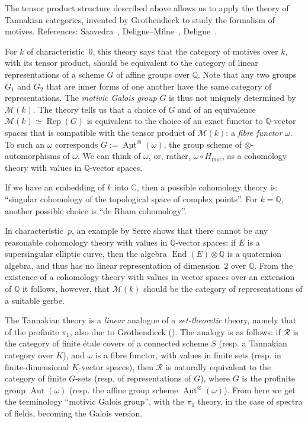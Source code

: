 \documentclass{article}
\theoremstyle{plain}
\theoremstyle{definition}
\newcommand{\scr}[1]{{\mathscr{#1}}}
\newcommand{\QQ}{\mathbb{Q}}
\newcommand{\CC}{\mathbb{C}}
\newcommand{\mot}{\mathrm{mot}}
\DeclareMathOperator{\End}{End}
\DeclareMathOperator{\Aut}{Aut}
\DeclareMathOperator{\Rep}{Rep}
\newcommand{\oldpage}[1]{\marginpar{\footnotesize$\Big\vert$ \textit{p.~#1}}}
\begin{document}
The tensor product structure described above allows us to apply the theory of Tannakian categories, invented by Grothendieck to study the formalism of motives.
References: Saavedra~\cite{28}, Deligne--Milne~\cite{12}, Deligne~\cite{15}.

For $k$ of characteristic~$0$, this theory says that the category of motives over $k$, with its tensor product, should be equivalent to the category of linear representations of a scheme $G$ of affine groups over $\QQ$.
Note that any two groups $G_1$ and $G_2$ that are inner forms of one another have the same category of representations.
The \emph{motivic Galois group} $G$ is thus not uniquely determined by $\scr{M}(k)$.
The theory tells us that a choice of $G$ and of an equivalence $\scr{M}(k)\simeq\Rep(G)$ is equivalent to the choice of an exact functor to $\QQ$-vector spaces that is compatible with the tensor product of $\scr{M}(k)$: a \emph{fibre functor} $\omega$.
To such an $\omega$ corresponds $G:=\underline{\Aut}^\otimes(\omega)$, the group scheme of $\otimes$-automorphisms of $\omega$.
We can think of $\omega$, or, rather, $\omega\circ H_\mot$, as a cohomology theory with values in $\QQ$-vector spaces.

\oldpage{146}
If we have an embedding of $k$ into $\CC$, then a possible cohomology theory is: ``singular cohomology of the topological space of complex points''.
For $k=\QQ$, another possible choice is ``de Rham cohomology''.

In characteristic~$p$, an example by Serre shows that there cannot be any reasonable cohomology theory with values in $\QQ$-vector spaces: if $E$ is a supersingular elliptic curve, then the algebra $\End(E)\otimes\QQ$ is a quaternion algebra, and thus has no linear representation of dimension~$2$ over $\QQ$.
From the existence of a cohomology theory with values in vector spaces over an extension of $\QQ$ it follows, however, that $\scr{M}(k)$ should be the category of representations of a suitable gerbe.

The Tannakian theory is a \emph{linear} analogue of a \emph{set-theoretic} theory, namely that of the profinite $\pi_1$, also due to Grothendieck (\cite{SGA1}).
The analogy is as follows: if $\scr{R}$ is the category of finite \'{e}tale covers of a connected scheme $S$ (resp. a Tannakian category over $K$), and $\omega$ is a fibre functor, with values in finite sets (resp. in finite-dimensional $K$-vector spaces), then $\scr{R}$ is naturally equivalent to the category of finite $G$-sets (resp. of representations of $G$), where $G$ is the profinite group $\Aut(\omega)$ (resp. the affine group scheme $\underline{\Aut}^\otimes(\omega)$).
From here we get the terminology ``motivic Galois group'', with the $\pi_1$ theory, in the case of spectra of fields, becoming the Galois version.
\end{document}
